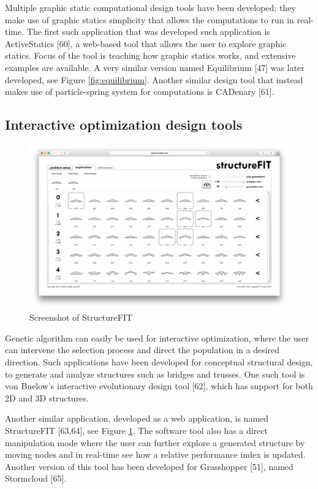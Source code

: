 Multiple graphic static computational design tools have been developed; they make use of graphic statics simplicity that allows the computations to run in real-time. The first such application that was developed such application is ActiveStatics [60], a web-based tool that allows the user to explore graphic statics. Focus of the tool is teaching how graphic statics works, and extensive examples are available. A very similar version named Equilibrium [47] was later developed, see Figure \ref{fig:equilibrium}. Another similar design tool that instead makes use of particle-spring system for computations is CADenary [61].


\subsection{Interactive optimization design tools}

\begin{figure}
  \includegraphics[width=350pt]{graphics/structurefit.png}
  \caption{Screenshot of StructureFIT}
  \label{fig:structurefit}
\end{figure}

Genetic algorithm can easily be used for interactive optimization, where the user can intervene the selection process and direct the population in a desired direction. Such applications have been developed for conceptual structural design, to generate and analyze structures such as bridges and trusses. One such tool is von Buelow’s interactive evolutionary design tool [62], which has support for both 2D and 3D structures.

Another similar application, developed as a web application, is named StructureFIT [63,64], see Figure \ref{fig:structurefit}. The software tool also has a direct manipulation mode where the user can further explore a generated structure by moving nodes and in real-time see how a relative performance index is updated. Another version of this tool has been developed for Grasshopper [51], named Stormcloud [65].

